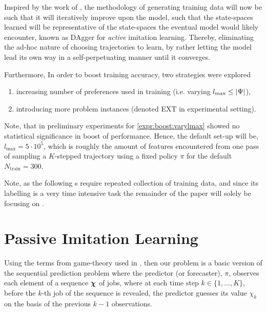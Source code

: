 \documentclass[smallextended]{svjour3}
\begin{document}
Inspired by the work of \cite{RossB10,RossGB11}, the methodology of generating 
training data will now be such that it will iteratively improve upon the model, 
such that the state-spaces learned will be representative of the state-spaces 
the eventual model would likely encounter, known as DAgger for \emph{active} 
imitation learning.
Thereby, eliminating the ad-hoc nature of choosing trajectories to learn, by 
rather letting the model lead its own way in a self-perpetuating manner until 
it converges.

Furthermore, In order to boost training accuracy, two strategies were explored 
\begin{enumerate}[after={{}}, leftmargin=*,
  label={\textbf{Boost.\arabic*}}, ref={{Boost.\arabic*}}]
  \item \label{expr:boost:varylmax} increasing number of preferences used 
  in training (i.e. varying \mbox{$l_{\max} \leq \lvert\Psi\rvert$}),
  \item \label{expr:boost:newdata} introducing more problem instances (denoted 
  EXT in experimental setting).
\end{enumerate}
Note, that in preliminary experiments for \ref{expr:boost:varylmax} showed no 
statistical significance in boost of performance. Hence, the default set-up 
will be, $l_{\max}=5 \cdot 10^5$, which is roughly the amount of features 
encountered from one pass of sampling a \mbox{$K$-stepped} trajectory using a 
fixed policy $\pi$ for the default $N_{\text{train}}=300$.

Note, as the following s require repeated collection 
of training data, and since its labelling is a very time intensive task the 
remainder of the paper will solely be focusing on .

\section{Passive Imitation Learning}\label{sec:il:passive}
Using the terms from game-theory used in \cite{CesaBianchi06}, %
then our problem is a basic version of the sequential prediction problem where 
the predictor (or forecaster), $\pi$, observes each element of a sequence 
$\bm \chi$ of jobs, where at each time step $k \in \{1,...,K\}$, before the 
$k$-th job of the sequence is revealed, the predictor guesses its value 
$\chi_k$ on the basis of the previous $k-1$ observations. 
\end{document}
